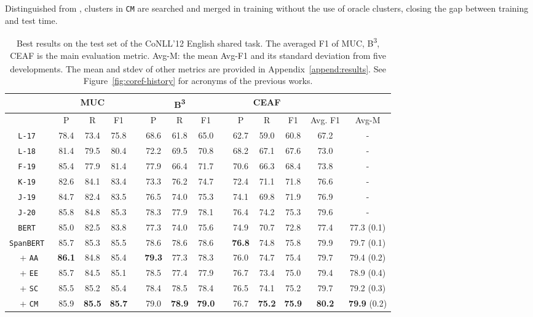 \documentclass[11pt,a4paper]{article}
\newcommand\AAA{\texttt{AA}}  \newcommand\EE{\texttt{EE}}
\newcommand\SC{\texttt{SC}}
\newcommand\CM{\texttt{CM}}
\begin{document}
Distinguished from \citet{wiseman-etal-2016-learning}, clusters in \texttt{CM} are searched and merged in training without the use of oracle clusters, closing the gap between training and test time.

 \begin{table*}[htbp!]
\small
\centering
\begin{tabular}{>{\quad}cccccccccccccc}
\toprule
 & \multicolumn{3}{c}{MUC} & & \multicolumn{3}{c}{B\textsuperscript{3}} & & \multicolumn{3}{c}{CEAF\textsubscript{}}\\
 \cmidrule{2-4} \cmidrule{6-8} \cmidrule{10-12}
 & P & R & F1 & & P & R & F1 & & P & R & F1 & Avg. F1 & Avg-M \\
\midrule
\tt L-17 & 78.4 & 73.4 & 75.8 & & 68.6 & 61.8 & 65.0 & & 62.7 & 59.0 & 60.8 & 67.2 & - \\
\tt L-18 & 81.4 & 79.5 & 80.4 & & 72.2 & 69.5 & 70.8 & & 68.2 & 67.1 & 67.6 & 73.0 & - \\
\tt F-19 & 85.4 & 77.9 & 81.4 & & 77.9 & 66.4 & 71.7 & & 70.6 & 66.3 & 68.4 & 73.8 & - \\
\tt K-19 & 82.6 & 84.1 & 83.4 & & 73.3 & 76.2 & 74.7 & & 72.4 & 71.1 & 71.8 & 76.6 & - \\
\tt J-19 & 84.7 & 82.4 & 83.5 & & 76.5 & 74.0 & 75.3 & & 74.1 & 69.8 & 71.9 & 76.9 & - \\
\tt J-20 & 85.8 & 84.8 & 85.3 & & 78.3 & 77.9 & 78.1 & & 76.4 & 74.2 & 75.3 & 79.6 & - \\
\midrule
\tt BERT & 85.0 & 82.5 & 83.8 & & 77.3 & 74.0 & 75.6 & & 74.9 & 70.7 & 72.8 & 77.4 & 77.3 (0.1) \\
\tt SpanBERT & 85.7 & 85.3 & 85.5 & & 78.6 & 78.6 & 78.6 & & \bf 76.8 & 74.8 & 75.8 & 79.9 & 79.7 (0.1) \\
+ \AAA & \bf 86.1 & 84.8 & 85.4 & & \bf 79.3 & 77.3 & 78.3 & & 76.0 & 74.7 & 75.4 & 79.7 & 79.4 (0.2) \\
+ \EE  & 85.7 & 84.5 & 85.1 & & 78.5 & 77.4 & 77.9 & & 76.7 & 73.4 & 75.0 & 79.4 & 78.9 (0.4) \\
+ \SC  & 85.5 & 85.2 & 85.4 & & 78.4 & 78.5 & 78.4 & & 76.5 & 74.1 & 75.2 & 79.7 & 79.2 (0.3) \\
+ \CM  & 85.9 & \bf 85.5 & \bf 85.7 & & 79.0 & \bf 78.9 & \bf 79.0 & & 76.7 & \bf 75.2 & \bf 75.9 & \bf 80.2 & \textbf{79.9} (0.2) \\
\bottomrule
\end{tabular}
\caption{Best results on the test set of the CoNLL'12 English shared task. The averaged F1 of MUC, B\textsuperscript{3}, CEAF\textsubscript{} is the main evaluation metric. Avg-M: the mean Avg-F1 and its standard deviation from five developments. The mean and stdev of other metrics are provided in Appendix~\ref{append:results}. See Figure~\ref{fig:coref-history} for acronyms of the previous works.}
\label{table:results}
\end{table*}
\end{document}
